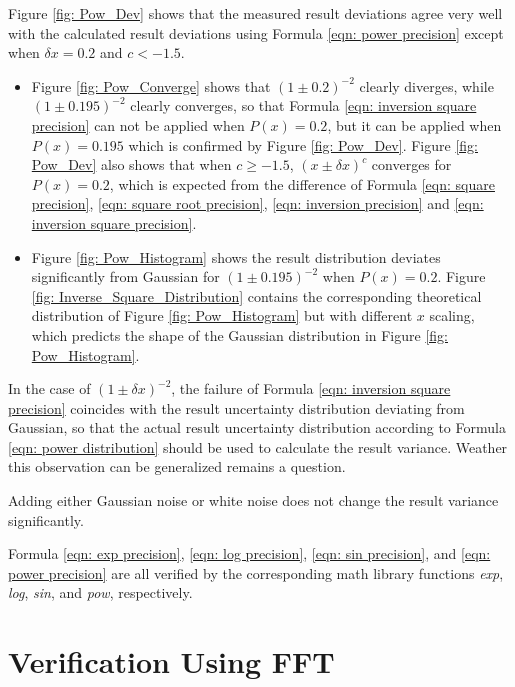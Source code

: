 \documentclass[twoside]{article}
\numberwithin{equation}{section}
\begin{document}
Figure \ref{fig: Pow_Dev} shows that the measured result deviations agree very well with the calculated result deviations using Formula \eqref{eqn: power precision} except when $\delta x =0.2$ and $c < -1.5$.  
\begin{itemize}
\item Figure \ref{fig: Pow_Converge} shows that $(1 \pm 0.2)^{-2}$ clearly diverges, while $(1 \pm 0.195)^{-2}$ clearly converges, so that Formula \eqref{eqn: inversion square precision} can not be applied when $P(x) = 0.2$, but it can be applied when $P(x) = 0.195$ which is confirmed by Figure \ref{fig: Pow_Dev}.
Figure \ref{fig: Pow_Dev} also shows that when $c \geq -1.5$, $(x \pm \delta x)^c$ converges for $P(x) = 0.2$, which is expected from the difference of Formula \eqref{eqn: square precision}, \eqref{eqn: square root precision}, \eqref{eqn: inversion precision} and \eqref{eqn: inversion square precision}.

\item Figure \ref{fig: Pow_Histogram} shows the result distribution deviates significantly from Gaussian for $(1 \pm 0.195)^{-2}$ when $P(x) = 0.2$.
Figure \ref{fig: Inverse_Square_Distribution} contains the corresponding theoretical distribution of Figure \ref{fig: Pow_Histogram} but with different $x$ scaling, which predicts the shape of the Gaussian distribution in Figure \ref{fig: Pow_Histogram}.
\end{itemize}
In the case of $(1 \pm \delta x)^{-2}$, the failure of Formula \eqref{eqn: inversion square precision} coincides with the result uncertainty distribution deviating from Gaussian, so that the actual result uncertainty distribution according to Formula \eqref{eqn: power distribution} should be used to calculate the result variance.
Weather this observation can be generalized remains a question.

Adding either Gaussian noise or white noise does not change the result variance significantly.

Formula \eqref{eqn: exp precision}, \eqref{eqn: log precision}, \eqref{eqn: sin precision}, and \eqref{eqn: power precision} are all verified by the corresponding math library functions \textit{exp}, \textit{log}, \textit{sin}, and \textit{pow}, respectively.


\clearpage
\section{Verification Using FFT}
\label{sec: FFT}
\end{document}
